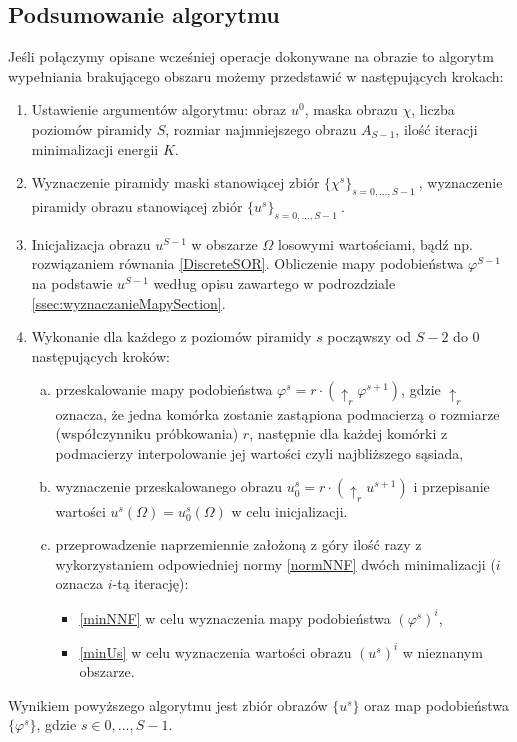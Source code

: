 \documentclass[12pt, twoside, openany]{report}
\theoremstyle{definition}
\begin{document}
\subsection{Podsumowanie algorytmu}
\label{ssec:VFIPodsumowanie}
Jeśli połączymy opisane wcześniej operacje dokonywane na obrazie to algorytm wypełniania brakującego obszaru możemy przedstawić w następujących krokach:
\begin{enumerate}
\item
Ustawienie argumentów algorytmu: obraz $u^{0}$, maska obrazu $\chi$, liczba poziomów piramidy $S$, rozmiar najmniejszego obrazu $A_{S-1}$, ilość iteracji minimalizacji energii $K$.
\item
Wyznaczenie piramidy maski stanowiącej zbiór $\{\chi^s\}_{s=0,...,S-1} \ $, wyznaczenie piramidy obrazu stanowiącej zbiór $\{u^s\}_{s=0,...,S-1} \ $.
\item
Inicjalizacja obrazu $u^{S-1}$ w obszarze $\Omega$ losowymi wartościami, bądź np. rozwiązaniem równania \eqref{DiscreteSOR}. Obliczenie mapy podobieństwa $\varphi^{S-1}$ na podstawie $u^{S-1}$ według opisu zawartego w podrozdziale \ref{ssec:wyznaczanieMapySection}.
\item
Wykonanie dla każdego z poziomów piramidy $s$ począwszy od $S-2$ do $0$ następujących kroków:
\begin{enumerate}[a)]
\item
przeskalowanie mapy podobieństwa $\varphi^s=r \cdot (\uparrow_r \varphi^{s+1})$, gdzie $\uparrow_r$ oznacza, że jedna komórka zostanie zastąpiona podmacierzą o rozmiarze (współczynniku próbkowania) $r$, następnie dla każdej komórki z podmacierzy interpolowanie jej wartości czyli najbliższego sąsiada,
\item
wyznaczenie przeskalowanego obrazu $u^s_0=r \cdot (\uparrow_r u^{s+1})$ i przepisanie wartości $u^s(\Omega)=u^s_0(\Omega)$ w celu inicjalizacji.
\item
przeprowadzenie naprzemiennie założoną z góry ilość razy z wykorzystaniem odpowiedniej normy \eqref{normNNF} dwóch minimalizacji ($i$ oznacza $i$-tą iterację):
\begin{itemize}
\item
\eqref{minNNF} w celu wyznaczenia mapy podobieństwa ${\left(\varphi^s\right)}^i$,
\item
\eqref{minUs} w celu wyznaczenia wartości obrazu ${\left(u^s\right)}^i$ w nieznanym obszarze.
\end{itemize}
\end{enumerate}
\end{enumerate}
Wynikiem powyższego algorytmu jest zbiór obrazów $\{u^s\}$ oraz map podobieństwa $\{\varphi^s\}$, gdzie $s \in {0,...,S-1}$.
\end{document}
